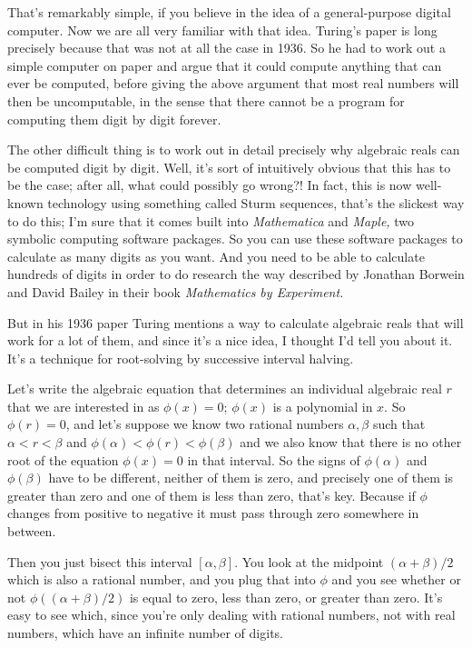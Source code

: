 \documentclass[12pt]{book}
\begin{document}
That's remarkably simple, if you believe in the idea of a general-purpose digital
computer. Now we are all very familiar with that idea.  Turing's paper is long precisely
because that was not at all the case in 1936. So he had to work out a simple computer
on paper and argue that it could compute anything that can ever be computed, before giving
the above argument that most real numbers will then be uncomputable, in the sense
that there cannot be a program for computing them digit by digit forever.
 
The other difficult thing is to work out in detail precisely why algebraic reals can
be computed digit by digit.
Well, it's sort of intuitively obvious that this has to be the case; after all, what
could possibly go wrong?!
In fact, this is now well-known technology using something called Sturm sequences,
that's the slickest way to do this; I'm sure that
it comes built into \emph{Mathematica} and \emph{Maple,}
two symbolic computing software packages.
So you can use these software packages to calculate as many digits as you want.
And you need to be able to calculate hundreds of digits in
order to do research
the way described by Jonathan Borwein and David Bailey 
in their book \emph{Mathematics by Experiment.}
 
But in his 1936 paper Turing mentions a way to calculate algebraic reals that will
work for a lot of them, and since it's a nice idea, I thought I'd tell you about it.
It's a technique for root-solving by successive interval halving.
 
Let's write the algebraic equation that determines an individual algebraic real $r$ that 
we are interested in as $\phi(x) = 0$; $\phi(x)$ is a polynomial in $x$.
So $\phi(r) = 0$, and let's suppose we know two rational numbers $\alpha, \beta$ such that
$\alpha < r < \beta$ and $\phi(\alpha) < \phi(r) < \phi(\beta)$
and we also know that there is no other root of the equation  $\phi(x) = 0$ in that interval.
So the signs of 
$\phi(\alpha)$ and $\phi(\beta)$
have to be different, neither of them is zero, and precisely one of them is greater than
zero and one of them is less than zero, that's key.
Because if $\phi$ changes from positive to negative it must pass through zero somewhere in between.
 
Then you just bisect this interval $[\alpha,\beta]$.  You look at the midpoint
$(\alpha+\beta)/2$ which is also a rational number, and you plug that into $\phi$ and
you see whether or not $\phi((\alpha+\beta)/2)$ is equal to zero, less than zero,
or greater than zero. It's easy to see which, since you're only dealing with rational numbers,
not with real numbers, which have an infinite number of digits.
 
\end{document}
